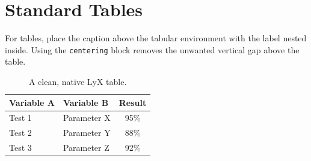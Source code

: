 \section{Standard Tables}
\label{sec:tables}

For tables, place the caption above the tabular environment with the label nested inside. Using the \texttt{centering} block removes the unwanted vertical gap above the table.

\begin{table}[H]
\caption{A clean, native LyX table.\label{tab:results}}
\begin{centering}
\begin{tabular}{llc}
\toprule
Variable A & Variable B & Result \\
\midrule
Test 1 & Parameter X & 95\% \\
Test 2 & Parameter Y & 88\% \\
Test 3 & Parameter Z & 92\% \\
\bottomrule
\end{tabular}
\par\end{centering}

\end{table}